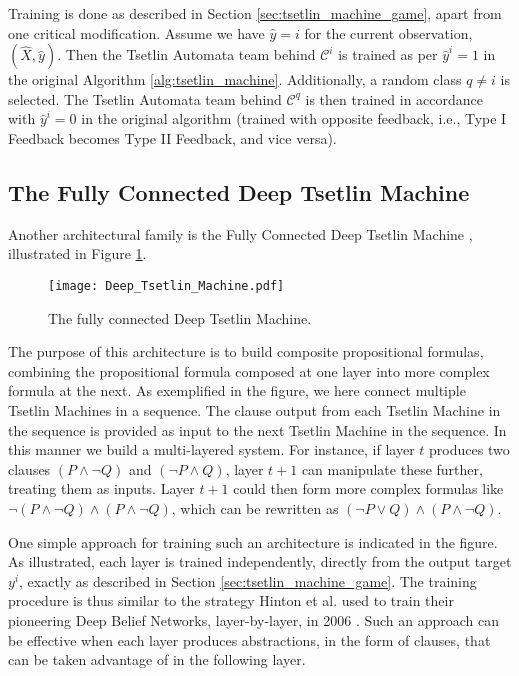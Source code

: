 \documentclass[11pt,a4paper]{article}
\begin{document}
Training is done as described in Section \ref{sec:tsetlin_machine_game}, apart from one critical modification. Assume we have $\hat{y}=i$ for the current observation, $(\hat{X},\hat{y})$. Then the Tsetlin Automata team behind $\mathcal{C}^i$ is trained as per $\hat{y}^i=1$ in the original Algorithm \ref{alg:tsetlin_machine}. Additionally, a random class $q \ne i$ is selected. The Tsetlin Automata team behind $\mathcal{C}^q$ is then trained in accordance with $\hat{y}^i=0$ in the original algorithm (trained with opposite feedback, i.e., Type I Feedback becomes Type II Feedback, and vice versa).

\subsection{The Fully Connected Deep Tsetlin Machine}

Another architectural family is the Fully Connected Deep Tsetlin Machine \cite{Granmo2018b}, illustrated in Figure \ref{figure:deep_tsetlin_machine}. 
\begin{figure}[!th]
\centering
\texttt{[image: Deep\_Tsetlin\_Machine.pdf]}
\caption{The fully connected Deep Tsetlin Machine.}
\label{figure:deep_tsetlin_machine}
\end{figure}
The purpose of this architecture is to build composite propositional formulas, combining the propositional formula composed at one layer into more complex formula at the next. As exemplified in the figure, we here connect multiple Tsetlin Machines in a sequence. The clause output from  each Tsetlin Machine in the sequence is provided as input to the next Tsetlin Machine in the sequence. In this manner we build a multi-layered system.  For instance, if layer $t$ produces two clauses $(P \land \lnot Q)$ and $(\lnot P \land Q)$, layer $t+1$ can manipulate these further, treating them as inputs. Layer $t+1$ could then form more complex formulas like $\lnot (P \land \lnot Q) \land (P \land \lnot Q)$, which can be rewritten as $(\lnot P \lor Q) \land (P \land \lnot Q)$.

One simple approach for training such an architecture is indicated in the figure. As illustrated, each layer is trained independently, directly from the output target $y^i$, exactly as described in Section \ref{sec:tsetlin_machine_game}. The training procedure is thus similar to the strategy Hinton et al. used to train their pioneering Deep Belief Networks, layer-by-layer, in 2006 \cite{Hinton2006}. Such an approach can be effective when each layer produces abstractions, in the form of clauses, that can be taken advantage of in the following layer.
\end{document}
